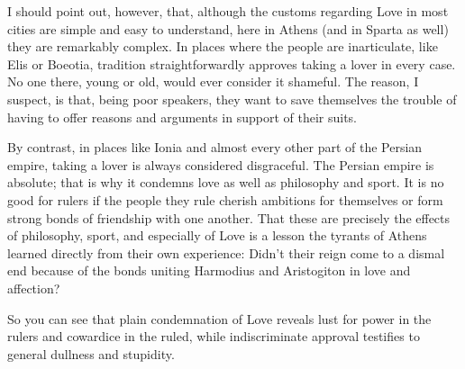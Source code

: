 I should point out, however, that, although the customs regarding Love
in most cities are simple and easy to understand, here in Athens (and in
 Sparta as well) they are remarkably complex. In places where the
people are inarticulate, like Elis or Boeotia, tradition
straightforwardly approves taking a lover in every case. No one there,
young or old, would ever consider it shameful. The reason, I suspect, is
that, being poor speakers, they want to save themselves the trouble of
having to offer reasons and arguments in support of their suits.

By contrast, in places like Ionia and almost every other part of the
Persian empire, taking a lover is always considered disgraceful. The
Persian empire is absolute; that is why it condemns love as well as
philosophy and sport.  It is no good for rulers if the people
they rule cherish ambitions for themselves or form strong bonds of
friendship with one another. That these are precisely the effects of
philosophy, sport, and especially of Love is a lesson the tyrants of
Athens learned directly from their own experience: Didn’t their reign
come to a dismal end because of the bonds uniting Harmodius and
Aristogiton in love and
affection? 

So you can see that plain condemnation of Love reveals lust for power in
the rulers and cowardice in the ruled, while indiscriminate approval
testifies to general dullness and stupidity.


